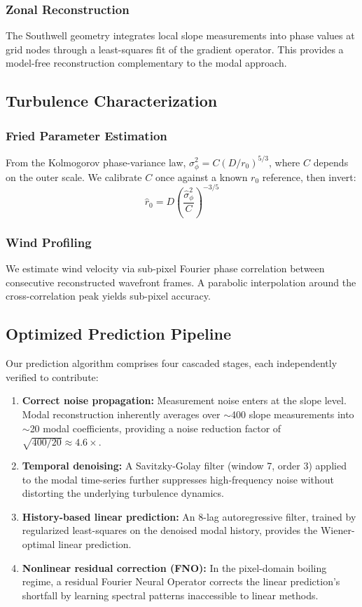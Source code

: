 \documentclass[conference]{IEEEtran}
\begin{document}
\subsubsection{Zonal Reconstruction}
The Southwell geometry integrates local slope measurements into phase values at grid nodes through a least-squares fit of the gradient operator. This provides a model-free reconstruction complementary to the modal approach.

\subsection{Turbulence Characterization}

\subsubsection{Fried Parameter Estimation}
From the Kolmogorov phase-variance law, $\sigma^2_\phi = C(D/r_0)^{5/3}$, where $C$ depends on the outer scale. We calibrate $C$ once against a known $r_0$ reference, then invert:
\begin{equation}
\hat{r}_0 = D\left(\frac{\hat{\sigma}^2_\phi}{C}\right)^{-3/5}
\end{equation}

\subsubsection{Wind Profiling}
We estimate wind velocity via sub-pixel Fourier phase correlation between consecutive reconstructed wavefront frames. A parabolic interpolation around the cross-correlation peak yields sub-pixel accuracy.

\subsection{Optimized Prediction Pipeline}

Our prediction algorithm comprises four cascaded stages, each independently verified to contribute:

\begin{enumerate}
\item \textbf{Correct noise propagation:} Measurement noise enters at the slope level. Modal reconstruction inherently averages over $\sim$400 slope measurements into $\sim$20 modal coefficients, providing a noise reduction factor of $\sqrt{400/20} \approx 4.6\times$.
\item \textbf{Temporal denoising:} A Savitzky-Golay filter (window 7, order 3) applied to the modal time-series further suppresses high-frequency noise without distorting the underlying turbulence dynamics.
\item \textbf{History-based linear prediction:} An 8-lag autoregressive filter, trained by regularized least-squares on the denoised modal history, provides the Wiener-optimal linear prediction.
\item \textbf{Nonlinear residual correction (FNO):} In the pixel-domain boiling regime, a residual Fourier Neural Operator corrects the linear prediction's shortfall by learning spectral patterns inaccessible to linear methods.
\end{enumerate}
\end{document}
